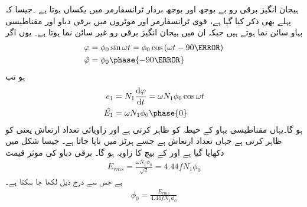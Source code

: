 ہیجان انگیز برقی رو بے بوجھ اور بوجھ بردار ٹرانسفارمر میں یکساں ہوتا ہے ۔جیسا کہ پہلے بھی ذکر کیا گیا ہے، قوی ٹرانسفارمر اور موٹروں میں برقی دباو اور مقناطیسی بہاو سائن نما ہوتے ہیں جبکہ ان میں ہیجان انگیز برقی رو  غیر سائن نما ہوتا ہے۔ یوں اگر
\begin{gather}
\begin{aligned}
\varphi&=\phi_0 \sin \omega t=\phi_0 \cos \left(\omega t -90\degree \right)\\
\hat{\varphi}&=\phi_0 \phase{-90\degree}
\end{aligned}
\end{gather}
ہو تب
\begin{gather}
\begin{aligned}\label{مساوات_ٹڑانسفارمر_دباو_سمتیہ}
e_1&=N_1 \frac{\dif \varphi}{\dif t}=\omega N_1 \phi_0 \cos \omega t\\
\hat{E_1}&=\omega N_1 \phi_0 \phase{0}
\end{aligned}
\end{gather}
ہو گا۔یہاں  مقناطیسی بہاو کے حیطہ کو ظاہر کرتی ہے اور  زاویائی تعداد ارتعاش یعنی  کو ظاہر کرتی ہے  جہاں  تعداد ارتعاش ہے جسے ہرٹز  میں ناپا جاتا ہے۔ جیسا شکل  میں دکھایا گیا ہے  اور  کے بیچ  کا زاویہ ہو گا۔ برقی دباو  کی موثر قیمت   
\begin{align}
E_{rms}=\frac{\omega N_1 \phi_0}{\sqrt{2}}=4.44 f N_1 \phi_0
\end{align}
ہے جس سے درج ذیل لکھا جا سکتا ہے۔
\begin{align}\label{مساوات_ٹرانسفارمر_درکار_ہیجان_بہاو}
\phi_0=\frac{E_{rms}}{4.44 f N_1 \phi_0}
\end{align}

